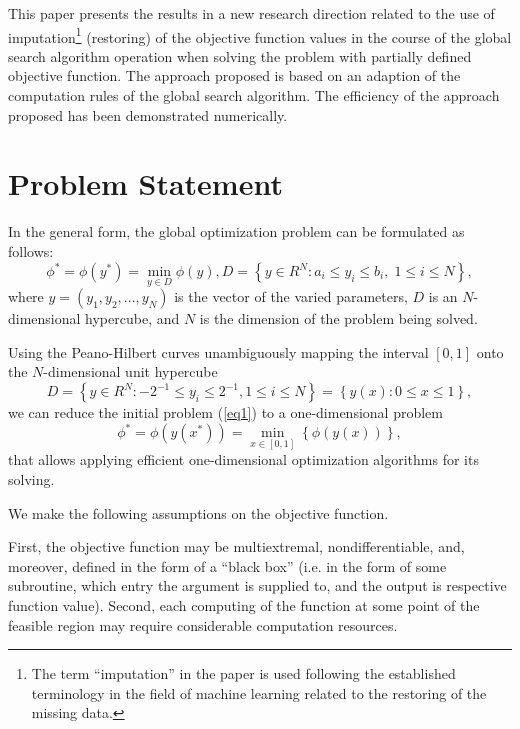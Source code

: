 \documentclass[runningheads]{llncs}
\begin{document}
This paper presents the results in a new research direction related to the use of imputation\footnote{The term ``imputation'' in the paper is used following the established terminology in the field of machine learning related to the restoring of the missing data.} (restoring) of the objective function values in the course of the global search algorithm operation when solving the problem with partially defined objective function. The approach proposed is based on an adaption of the computation rules of the global search algorithm. The efficiency of the approach proposed has been demonstrated numerically.

\section{Problem Statement}

In the general form, the global optimization problem can be formulated as follows:
\begin{equation}\label{eq1} 
\phi^*=\phi(y^* )=\min_{y \in D} \phi(y), D=\left\{ y \in R^N: a_i \leq y_i \leq b_i, \; 1 \leq i \leq N \right\},
\end{equation}
where $y=(y_1,y_2,...,y_N)$ is the vector of the varied parameters, $D$ is an $N$-dimensional hypercube, and $N$ is the dimension of the problem being solved.

Using the Peano-Hilbert curves unambiguously mapping the interval $[0,1]$ onto the $N$-dimensional unit hypercube 
$$
D=\left\{ y \in R^N: -2^{-1} \leq y_i \leq 2^{-1}, 1 \leq i \leq N \right\} = \left\{ y(x): 0 \leq x \leq 1 \right\},
$$
we can reduce the initial problem (\ref{eq1}) to a one-dimensional problem
\begin{equation}\label{eq2} 
\phi^*=\phi(y(x^* ))=\min_{x \in [0,1]} \left\{ \phi(y(x)) \right\},
\end{equation}
that allows applying efficient one-dimensional optimization algorithms for its solving.

We make the following assumptions on the objective function. 

First, the objective function may be multiextremal, nondifferentiable, and, moreover, defined in the form of a ``black box'' (i.e. in the form of some subroutine, which entry the argument is supplied to, and the output is respective function value).
Second, each computing of the function at some point of the feasible region may require considerable computation resources.
\end{document}
